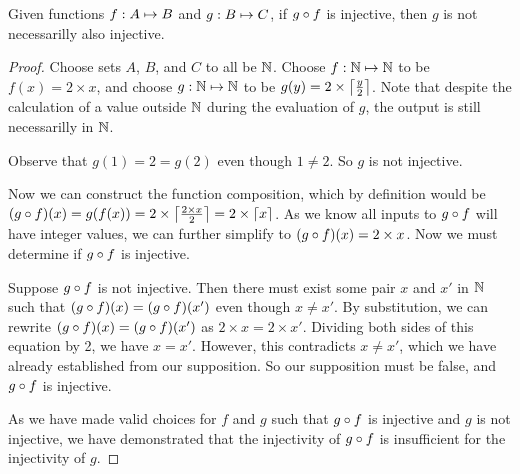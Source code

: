 \documentclass[main.tex]{subfiles}
\begin{document}
\begin{thm}
	Given functions \({f}: {A} \mapsto{} {B}\) and \({g}: {B} \mapsto{} {C}\), if
	\({g} \circ{} {f}\) is injective, then \(g\) is not necessarilly also
	injective.
\end{thm}
\begin{proof}
	Choose sets \(A\), \(B\), and \(C\) to all be \(\mathbb{N}\). Choose
	\({f}: {\mathbb{N}} \mapsto{} {\mathbb{N}}\) to be \(f(x) = 2 \times x\), and
	choose \({g}: {\mathbb{N}} \mapsto{} {\mathbb{N}}\) to be
	\(g(y) = 2 \times \left \lceil \frac{y}{2} \right \rceil\). Note that despite the
	calculation of a value outside \(\mathbb{N}\) during the evaluation of
	\(g\), the output is still necessarilly in \(\mathbb{N}\).

	Observe that \(g(1) = 2 = g(2)\) even though \(1 \neq 2\). So \(g\) is
	not injective.

	Now we can construct the function composition, which by definition would
	be
	\(({g} \circ{} {f})(x) = g(f(x)) = 2 \times \left \lceil \frac{2 \times x}{2} \right \rceil = 2 \times \left \lceil x \right \rceil\).
	As we know all inputs to \({g} \circ{} {f}\) will have integer values, we
	can further simplify to \(({g} \circ{} {f})(x) = 2 \times x\). Now we
	must determine if \({g} \circ{} {f}\) is injective.

	Suppose \({g} \circ{} {f}\) is not injective. Then there must exist some
	pair \(x\) and \(x'\) in \(\mathbb{N}\) such that
	\(({g} \circ{} {f})(x) = ({g} \circ{} {f})(x')\) even though
	\(x \neq x'\). By substitution, we can rewrite
	\(({g} \circ{} {f})(x) = ({g} \circ{} {f})(x')\) as
	\(2 \times x = 2 \times x'\). Dividing both sides of this equation by 2,
	we have \(x = x'\). However, this contradicts \(x \neq x'\), which we
	have already established from our supposition. So our supposition must
	be false, and \({g} \circ{} {f}\) is injective.

	As we have made valid choices for \(f\) and \(g\) such that
	\({g} \circ{} {f}\) is injective and \(g\) is not injective, we have
	demonstrated that the injectivity of \({g} \circ{} {f}\) is insufficient
	for the injectivity of \(g\).
\end{proof}
\end{document}
